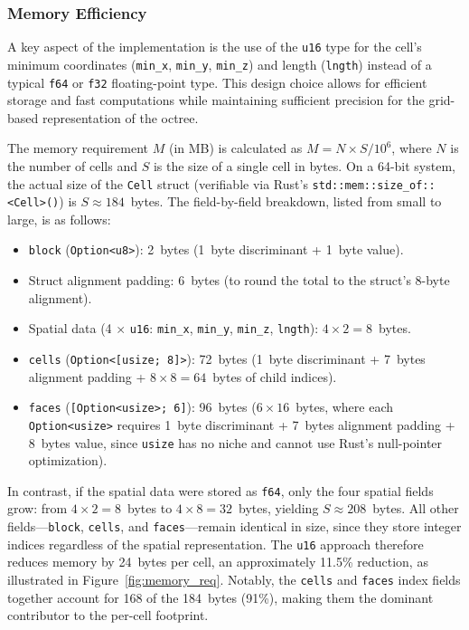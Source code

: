 \documentclass[review,12pt]{elsarticle}
\begin{document}
\subsubsection{Memory Efficiency}

A key aspect of the implementation is the use of the \lstinline!u16! type for the cell's minimum coordinates (\lstinline!min_x!, \lstinline!min_y!, \lstinline!min_z!) and length (\lstinline!lngth!) instead of a typical \lstinline!f64! or \lstinline!f32! floating-point type. This design choice allows for efficient storage and fast computations while maintaining sufficient precision for the grid-based representation of the octree. 

The memory requirement $M$ (in MB) is calculated as $M = N \times S / 10^6$, where $N$ is the number of cells and $S$ is the size of a single cell in bytes. On a 64-bit system, the actual size of the \lstinline!Cell! struct (verifiable via Rust's \lstinline!std::mem::size_of::<Cell>()!) is $S \approx 184$~bytes. The field-by-field breakdown, listed from small to large, is as follows:

\begin{itemize}
  \item \lstinline!block! (\lstinline!Option<u8>!): 2~bytes (1~byte discriminant + 1~byte value).
  \item Struct alignment padding: 6~bytes (to round the total to the struct's 8-byte alignment).
  \item Spatial data (4 $\times$ \lstinline!u16!: \lstinline!min_x!, \lstinline!min_y!, \lstinline!min_z!, \lstinline!lngth!): $4 \times 2 = 8$~bytes.
  \item \lstinline!cells! (\lstinline!Option<[usize; 8]>!): 72~bytes (1~byte discriminant + 7~bytes alignment padding + $8 \times 8 = 64$~bytes of child indices).
  \item \lstinline!faces! (\lstinline![Option<usize>; 6]!): 96~bytes ($6 \times 16$~bytes, where each \lstinline!Option<usize>! requires 1~byte discriminant + 7~bytes alignment padding + 8~bytes value, since \lstinline!usize! has no niche and cannot use Rust's null-pointer optimization).
\end{itemize}

In contrast, if the spatial data were stored as \lstinline!f64!, only the four spatial fields grow: from $4 \times 2 = 8$~bytes to $4 \times 8 = 32$~bytes, yielding $S \approx 208$~bytes. All other fields---\lstinline!block!, \lstinline!cells!, and \lstinline!faces!---remain identical in size, since they store integer indices regardless of the spatial representation. The \lstinline!u16! approach therefore reduces memory by 24~bytes per cell, an approximately 11.5\% reduction, as illustrated in Figure~\ref{fig:memory_req}. Notably, the \lstinline!cells! and \lstinline!faces! index fields together account for 168 of the 184~bytes (91\%), making them the dominant contributor to the per-cell footprint.
\end{document}
